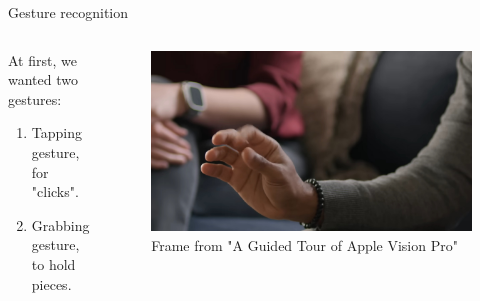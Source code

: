 \documentclass[english]{beamer}
\begin{document}
\begin{frame}{Gesture recognition}
    \begin{columns}
        \begin{column}{.3\textwidth}
            At first, we wanted two gestures:
            \begin{enumerate}
                \item Tapping gesture, for "clicks". \frownie{}
                \item Grabbing gesture, to hold pieces. \smiley{}
            \end{enumerate}
        \end{column}
        \begin{column}{.7\textwidth}
            \begin{figure}
                \centering
                \includegraphics[width=.9\textwidth]{images/apple_click.jpg}
                \caption{Frame from "A Guided Tour of Apple Vision Pro"}
            \end{figure}
        \end{column}
    \end{columns}
\end{frame}
\end{document}
